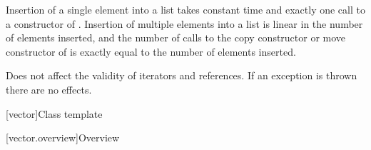 \documentclass{wg21}
\begin{document}
\begin{itemdescr}
    \pnum
    \complexity
    Insertion of a single element into a list takes constant time and
    exactly one call to a constructor of
    . Insertion of multiple elements into a list is linear in the
    number of elements inserted, and the number of calls to the copy
    constructor or move constructor of  is exactly equal
    to the number of elements inserted.
    
    \pnum
    \remarks
    Does not affect the validity of iterators and references.
    If an exception is thrown there are no effects.
\end{itemdescr}

[vector]{Class template }

[vector.overview]{Overview}
\end{document}
